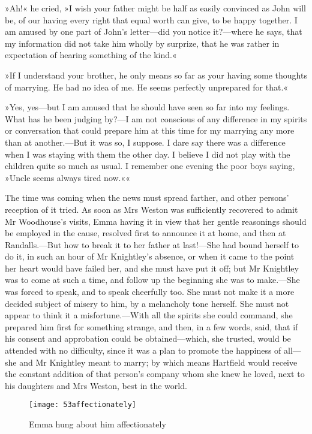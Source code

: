 »Ah!« he cried, »I wish your father might be half as easily convinced as John will be, of our having every right that equal worth can give, to be happy together. I am amused by one part of John's letter—did you notice it?—where he says, that my information did not take him wholly by surprize, that he was rather in expectation of hearing something of the kind.«

»If I understand your brother, he only means so far as your having some thoughts of marrying. He had no idea of me. He seems perfectly unprepared for that.«

»Yes, yes—but I am amused that he should have seen so far into my feelings. What has he been judging by?—I am not conscious of any difference in my spirits or conversation that could prepare him at this time for my marrying any more than at another.—But it was so, I suppose. I dare say there was a difference when I was staying with them the other day. I believe I did not play with the children quite so much as usual. I remember one evening the poor boys saying, »Uncle seems always tired now.««

The time was coming when the news must spread farther, and other persons' reception of it tried. As soon as Mrs Weston was sufficiently recovered to admit Mr Woodhouse's visits, Emma having it in view that her gentle reasonings should be employed in the cause, resolved first to announce it at home, and then at Randalls.—But how to break it to her father at last!—She had bound herself to do it, in such an hour of Mr Knightley's absence, or when it came to the point her heart would have failed her, and she must have put it off; but Mr Knightley was to come at such a time, and follow up the beginning she was to make.—She was forced to speak, and to speak cheerfully too. She must not make it a more decided subject of misery to him, by a melancholy tone herself. She must not appear to think it a misfortune.—With all the spirits she could command, she prepared him first for something strange, and then, in a few words, said, that if his consent and approbation could be obtained—which, she trusted, would be attended with no difficulty, since it was a plan to promote the happiness of all—she and Mr Knightley meant to marry; by which means Hartfield would receive the constant addition of that person's company whom she knew he loved, next to his daughters and Mrs Weston, best in the world.

\begin{figure}[tbph]
\centering
\texttt{[image: 53affectionately]}
\caption{Emma hung about him affectionately}
\end{figure}


